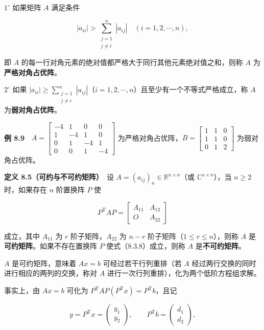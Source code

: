 \documentclass[
  10pt,
  fontset=fandol]{ctexart}
\begin{document}
\(1^\circ\) 如果矩阵 \(A\) 满足条件

\[
|a_{ii}|>\sum_{\substack{j=1\\j\neq i}}^n|a_{ij}|\quad(i=1,2,\cdots,n),
\tag{8.3.7}
\]

即 \(A\) 的每一行对角元素的绝对值都严格大于同行其他元素绝对值之和，则称 \(A\) 为\textbf{严格对角占优阵}。

\(2^\circ\) 如果 \(|a_{ii}|\geqslant\sum\limits_{\substack{j=1\\j\neq i}}^n|a_{ij}|\)（\(i=1,2,\cdots,n\)）且至少有一个不等式严格成立，称 \(A\) 为\textbf{弱对角占优阵}。

\textbf{例 8.9}　\(A=\begin{bmatrix}-4&1&0&0\\1&-4&1&0\\0&1&-4&1\\0&0&1&-4\end{bmatrix}\) 为严格对角占优阵，\(B=\begin{bmatrix}1&1&0\\1&1&0\\0&1&2\end{bmatrix}\) 为弱对角占优阵。

\textbf{定义 8.5（可约与不可约矩阵）}　设 \(A=(a_{ij})_n\in\mathbb R^{n\times n}\)（或 \(\mathbb C^{n\times n}\)），当 \(n\geqslant2\) 时，如果存在 \(n\) 阶置换阵 \(P\) 使

\[
P^{\mathrm T}AP=\begin{bmatrix}A_{11}&A_{12}\\O&A_{22}\end{bmatrix}
\tag{8.3.8}
\]

成立，其中 \(A_{11}\) 为 \(r\) 阶子矩阵，\(A_{22}\) 为 \(n-r\) 阶子矩阵（\(1\leqslant r\leqslant n\)），则称 \(A\) 是\textbf{可约矩阵}。如果不存在置换阵 \(P\) 使式（8.3.8）成立，则称 \(A\) 是\textbf{不可约矩阵}。

\(A\) 是可约矩阵，意味着 \(Ax=b\) 可经过若干行列重排（若 \(A\) 经过两行交换的同时进行相应的两列的交换，称对 \(A\) 进行一次行列重排），化为两个低阶方程组求解。

事实上，由 \(Ax=b\) 可化为 \(P^{\mathrm T}AP(P^{\mathrm T}x)=P^{\mathrm T}b\)，且记

\[
y=P^{\mathrm T}x=\begin{pmatrix}y_1\\y_2\end{pmatrix},\qquad
P^{\mathrm T}b=\begin{pmatrix}d_1\\d_2\end{pmatrix},
\]
\end{document}
